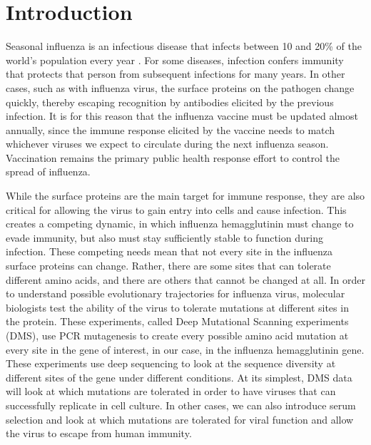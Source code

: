 \documentclass[sigchi, nonacm]{acmart}
\begin{document}



\section{Introduction}

Seasonal influenza is an infectious disease that infects between 10 and 20\% of the world's population every year \cite{neher2015nextflu}.
For some diseases, infection confers immunity that protects that person from subsequent infections for many years.
In other cases, such as with influenza virus, the surface proteins on the pathogen change quickly, thereby escaping recognition by antibodies elicited by the previous infection.
It is for this reason that the influenza vaccine must be updated almost annually, since the immune response elicited by  the vaccine needs to match whichever viruses we expect to circulate during the next influenza season.
Vaccination remains the primary public health response effort to control the spread of influenza.

While the surface proteins are the main target for immune response, they are also critical for allowing the virus to gain entry into cells and cause infection.
This creates a competing dynamic, in which influenza hemagglutinin must change to evade immunity, but also must stay sufficiently stable to function during infection.
These competing needs mean that not every site in the influenza surface proteins can change.
Rather, there are some sites that can tolerate different amino acids, and there are others that cannot be changed at all.
In order to understand possible evolutionary trajectories for influenza virus, molecular biologists test the ability of the virus to tolerate mutations at different sites in the protein.
These experiments, called Deep Mutational Scanning experiments (DMS), use PCR mutagenesis to create every possible amino acid mutation at every site in the gene of interest, in our case, in the influenza hemagglutinin gene.
These experiments use deep sequencing to look at the sequence diversity at different sites of the gene under different conditions.
At its simplest, DMS data will look at which mutations are tolerated in order to have viruses that can successfully replicate in cell culture.
In other cases, we can also introduce serum selection and look at which mutations are tolerated for viral function and allow the virus to escape from human immunity.
\end{document}
